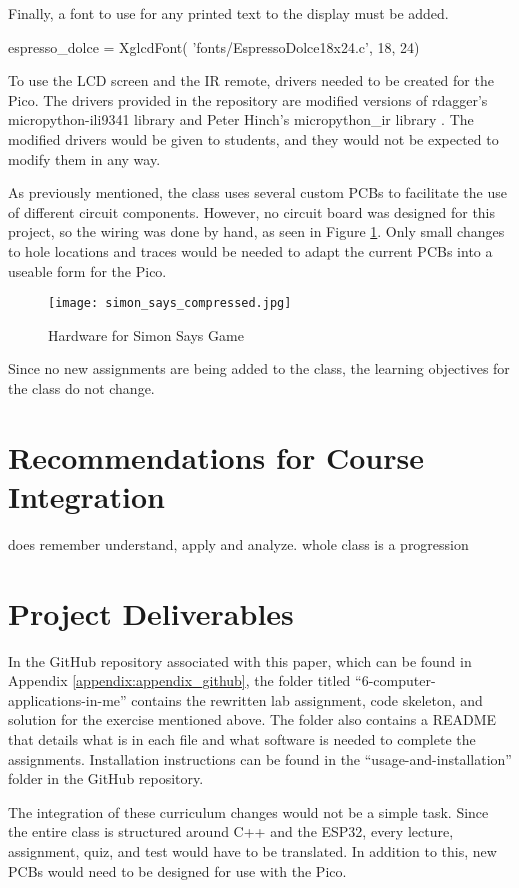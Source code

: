 \begin{tcolorbox}[breakable, enhanced jigsaw, title=ME 400: Assignment \ref{comp_app_assignment_1}, 
    colframe=ksu-purple, colback=ksu-gray]
Finally, a font to use for any printed text to the display must be added.

\begin{python}
espresso_dolce = XglcdFont(
    'fonts/EspressoDolce18x24.c', 18, 24)
\end{python}
\end{tcolorbox}

To use the LCD screen and the IR remote, drivers needed to be created for the Pico. 
The drivers provided in the repository are modified versions of
rdagger's micropython-ili9341 library \cite{micropython-ili9341} and Peter Hinch's 
micropython\_ir library \cite{micropython_ir2020}. The modified drivers would be given to 
students, and they would not be expected to modify them in any way.

As previously mentioned, the class uses several custom PCBs to facilitate the use
of different circuit components. However, no circuit board was designed for this 
project, so the wiring was done by hand, as seen in Figure \ref{fig:simon_says}. Only 
small changes to hole locations and traces would be needed to adapt the current PCBs 
into a useable form for the Pico.

\begin{figure}[h]
    \texttt{[image: simon\_says\_compressed.jpg]}
    \centering
    \caption{Hardware for Simon Says Game}
    \centering
    \label{fig:simon_says}
\end{figure}

Since no new assignments are being added to the class, the learning objectives for the 
class do not change.

\section{Recommendations for Course Integration}

does remember understand, apply and analyze. whole class is a progression

\section{Project Deliverables}

In the GitHub repository associated with this paper, which can be found in Appendix
\ref{appendix:appendix_github}, the folder titled ``6-computer-applications-in-me'' 
contains the rewritten lab assignment, code skeleton, and solution for the exercise
mentioned above. The folder also contains a README that details what is in each file
and what software is needed to complete the assignments. Installation instructions can
be found in the ``usage-and-installation'' folder in the GitHub repository.

The integration of these curriculum changes would not be a simple task. Since the 
entire class is structured around C++ and the ESP32, every lecture, assignment, quiz,
and test would have to be translated. In addition to this, new PCBs would need to be 
designed for use with the Pico. 
